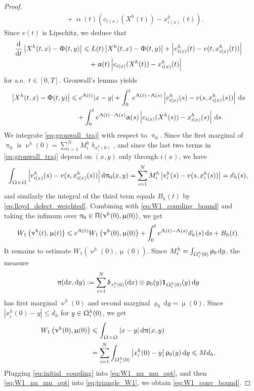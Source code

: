 \documentclass[letterpaper,11pt,twoside]{article}
\numberwithin{figure}{section}
\numberwithin{table}{section}
\theoremstyle{cpamplain}
\theoremstyle{cpamdefinition}
\newcommand{\diff}{\mathrm{d}}
\let\alpha\upalpha
\let\delta\updelta
\let\mu\upmu
\let\nu\upnu
\let\pi\uppi
\let\rho\uprho
\let\Lambda\Uplambda
\let\Pi\Uppi
\let\Phi\Upphi
\let\Omega\Upomega
\renewcommand{\le}{\leqslant}
\numberwithin{equation}{section}
\begin{document}
\begin{proof}
\begin{align*}
&\quad+\alpha(t)\left(c_{i(x)}(X^h(t))-x_{i(x)}^h(t)\right).
\end{align*}
Since $v(t)$ is Lipschitz, we deduce that
\begin{align*}
\frac{\diff}{\diff t}\left|X^h(t,x)-\Phi(t,y)\right|
&\le L(t)\left|X^h(t,x)-\Phi(t,y)\right|
+\left|v_{i(x)}^h(t)-v(t,x_{i(x)}^h(t))\right|\\
&\quad+\alpha(t)\left|c_{i(x)}(X^h(t))-x_{i(x)}^h(t)\right|
\end{align*}
for a.e.\ $t\in[0,T]$. Gronwall's lemma yields
\begin{align}
\left|X^h(t,x)-\Phi(t,y)\right|
&\le e^{\Lambda(t)}|x-y|
+\int_0^t e^{\Lambda(t)-\Lambda(s)}
\left|v_{i(x)}^h(s)-v(s,x_{i(x)}^h(s))\right|\,\diff s \notag\\
&\quad+\int_0^t e^{\Lambda(t)-\Lambda(s)}\alpha(s)
\left|c_{i(x)}(X^h(s))-x_{i(x)}^h(s)\right|\,\diff s. \label{eq:gronwall_traj}
\end{align}
We integrate \eqref{eq:gronwall_traj} with respect to $\pi_0$.
Since the first marginal of $\pi_0$ is $\nu^h(0)=\sum_{i=1}^N M_i^h\delta_{x_i^h(0)}$, and since the last two terms in \eqref{eq:gronwall_traj} depend on $(x,y)$ only through $i(x)$, we have
\[
\int_{\Omega\times\Omega}\left|v_{i(x)}^h(s)-v(s,x_{i(x)}^h(s))\right|\diff\pi_0(x,y)
=\sum_{i=1}^NM_i^h\left|v_i^h(s)-v(s,x_i^h(s))\right|
=\mathscr E_h(s),
\]
and similarly the integral of the third term equals $B_h(t)$ by \eqref{eq:lloyd_defect_weighted}.
Combining with \eqref{eq:W1_coupling_bound} and taking the infimum over $\pi_0\in\Pi(\nu^h(0),\mu(0))$, we get
\begin{equation}\label{eq:W1_nu_mu_opt}
W_1\left(\nu^h(t),\mu(t)\right)
\le e^{\Lambda(t)}W_1\left(\nu^h(0),\mu(0)\right)
+\int_0^t e^{\Lambda(t)-\Lambda(s)}\mathscr E_h(s)\,\diff s
+B_h(t).
\end{equation}
It remains to estimate $W_1(\nu^h(0),\mu(0))$.
Since $M_i^h=\int_{\Omega_i^h(0)}\rho_0\,\diff y$, the measure
\[
\pi(\diff x,\diff y):=\sum_{i=1}^N\delta_{x_i^h(0)}(\diff x)\otimes\rho_0(y)\mathbf 1_{\Omega_i^h(0)}(y)\,\diff y
\]
has first marginal $\nu^h(0)$ and second marginal $\rho_0\,\diff y=\mu(0)$.
Since $|x_i^h(0)-y|\le d_h$ for $y\in\Omega_i^h(0)$, we get
\begin{equation}\label{eq:initial_coupling}
\begin{aligned}
W_1\left(\nu^h(0),\mu(0)\right)
&\le\int_{\Omega\times\Omega}|x-y|\,\diff\pi(x,y)\\
&=\sum_{i=1}^N\int_{\Omega_i^h(0)}\left|x_i^h(0)-y\right|\rho_0(y)\,\diff y
\le M d_h .
\end{aligned}
\end{equation}
Plugging \eqref{eq:initial_coupling} into \eqref{eq:W1_nu_mu_opt}, and then \eqref{eq:W1_nu_mu_opt} into \eqref{eq:triangle_W1}, we obtain \eqref{eq:W1_conv_bound}.
\end{proof}
\end{document}
